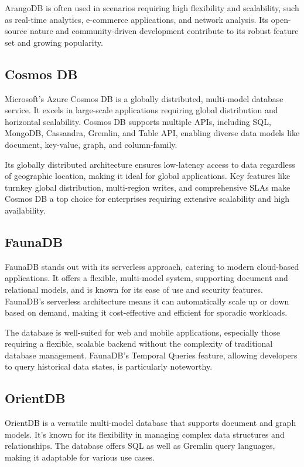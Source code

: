 \documentclass[a3paper,11pt]{extarticle}
\begin{document}
ArangoDB is often used in scenarios requiring high flexibility and scalability, such as real-time analytics, e-commerce applications, and network analysis. Its open-source nature and community-driven development contribute to its robust feature set and growing popularity.

\subsection*{Cosmos DB}
Microsoft's Azure Cosmos DB is a globally distributed, multi-model database service. It excels in large-scale applications requiring global distribution and horizontal scalability. Cosmos DB supports multiple APIs, including SQL, MongoDB, Cassandra, Gremlin, and Table API, enabling diverse data models like document, key-value, graph, and column-family.

Its globally distributed architecture ensures low-latency access to data regardless of geographic location, making it ideal for global applications. Key features like turnkey global distribution, multi-region writes, and comprehensive SLAs make Cosmos DB a top choice for enterprises requiring extensive scalability and high availability.

\subsection*{FaunaDB}
FaunaDB stands out with its serverless approach, catering to modern cloud-based applications. It offers a flexible, multi-model system, supporting document and relational models, and is known for its ease of use and security features. FaunaDB's serverless architecture means it can automatically scale up or down based on demand, making it cost-effective and efficient for sporadic workloads.

The database is well-suited for web and mobile applications, especially those requiring a flexible, scalable backend without the complexity of traditional database management. FaunaDB's Temporal Queries feature, allowing developers to query historical data states, is particularly noteworthy.

\subsection*{OrientDB}
OrientDB is a versatile multi-model database that supports document and graph models. It's known for its flexibility in managing complex data structures and relationships. The database offers SQL as well as Gremlin query languages, making it adaptable for various use cases.
\end{document}

